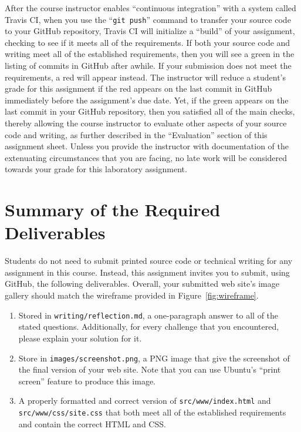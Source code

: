 \documentclass[11pt]{article}
\newcommand{\mainprogramsource}{\lstinline{src/www/index.html}}
\newcommand{\secondprogramsource}{\lstinline{src/www/css/site.css}}
\newcommand{\reflection}{\lstinline{writing/reflection.md}}
\newcommand{\screenshot}{\lstinline{images/screenshot.png}}
\newcommand{\gitpush}{\command{git push}}
\newcommand{\command}[1]{``\lstinline{#1}''}
\newcommand{\step}[1]{``{#1}''}
\newcommand{\checkmark}{\ding{51}}
\newcommand{\naughtmark}{\ding{55}}
\begin{document}
After the course instructor enables \step{continuous integration} with a system
called Travis CI, when you use the \gitpush{} command to transfer your source
code to your GitHub repository, Travis CI will initialize a \step{build} of your
assignment, checking to see if it meets all of the requirements. If both your
source code and writing meet all of the established requirements, then you will
see a green \checkmark{} in the listing of commits in GitHub after awhile. If
your submission does not meet the requirements, a red \naughtmark{} will appear
instead. The instructor will reduce a student's grade for this assignment if the
red \naughtmark{} appears on the last commit in GitHub immediately before the
assignment's due date. Yet, if the green \checkmark{} appears on the last commit
in your GitHub repository, then you satisfied all of the main checks, thereby
allowing the course instructor to evaluate other aspects of your source code and
writing, as further described in the \step{Evaluation} section of this
assignment sheet. Unless you provide the instructor with documentation of the
extenuating circumstances that you are facing, no late work will be considered
towards your grade for this laboratory assignment.

\section*{Summary of the Required Deliverables}

\noindent Students do not need to submit printed source code or technical
writing for any assignment in this course. Instead, this assignment invites you
to submit, using GitHub, the following deliverables. Overall, your submitted web
site's image gallery should match the wireframe provided in
Figure~\ref{fig:wireframe}.

\vspace*{-.1in}

\begin{enumerate}

  \setlength{\itemsep}{0in}

\item Stored in \reflection{}, a one-paragraph answer to all of the stated
  questions. Additionally, for every challenge that you encountered, please
  explain your solution for it.

\item Store in \screenshot{}, a PNG image that give the screenshot of the final
  version of your web site. Note that you can use Ubuntu's ``print screen''
  feature to produce this image.

\item A properly formatted and correct version of \mainprogramsource{} and
  \secondprogramsource{} that both meet all of the established requirements and
  contain the correct HTML and CSS.

\end{enumerate}
\end{document}

